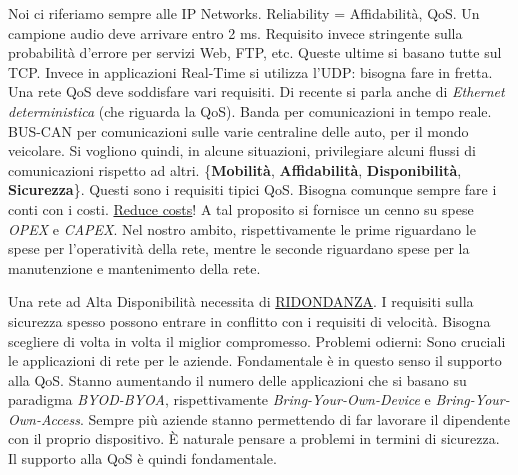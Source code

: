 Noi ci riferiamo sempre alle IP Networks. Reliability = Affidabilità, QoS. Un campione audio deve arrivare entro 2 ms. Requisito invece stringente sulla probabilità d'errore per servizi Web, FTP, etc. Queste ultime si basano tutte sul TCP. Invece in applicazioni Real-Time si utilizza l'UDP: bisogna fare in fretta. Una rete QoS deve soddisfare vari requisiti. Di recente si parla anche di \textit{Ethernet deterministica} (che riguarda la QoS). Banda per comunicazioni in tempo reale. BUS-CAN per comunicazioni sulle varie centraline delle auto, per il mondo veicolare. Si vogliono quindi, in alcune situazioni, privilegiare alcuni flussi di comunicazioni rispetto ad altri. \{\textbf{Mobilità}, \textbf{Affidabilità}, \textbf{Disponibilità}, \textbf{Sicurezza}\}. Questi sono i requisiti tipici QoS. Bisogna comunque sempre fare i conti con i costi. \underline{Reduce costs}! A tal proposito si fornisce un cenno su spese \textit{OPEX} e \textit{CAPEX}. Nel nostro ambito, rispettivamente le prime riguardano le spese per l'operatività della rete, mentre le seconde riguardano spese per la manutenzione e mantenimento della rete.

Una rete ad Alta Disponibilità necessita di \underline{RIDONDANZA}. I requisiti sulla sicurezza spesso possono entrare in conflitto con i requisiti di velocità. Bisogna scegliere di volta in volta il miglior compromesso.
Problemi odierni: Sono cruciali le applicazioni di rete per le aziende. Fondamentale è in questo senso il supporto alla QoS. Stanno aumentando il numero delle applicazioni che si basano su paradigma \textit{BYOD-BYOA}, rispettivamente \textit{Bring-Your-Own-Device} e \textit{Bring-Your-Own-Access}. Sempre più aziende stanno permettendo di far lavorare il dipendente con il proprio dispositivo. \`E naturale pensare a problemi in termini di sicurezza. Il supporto alla QoS è quindi fondamentale.

